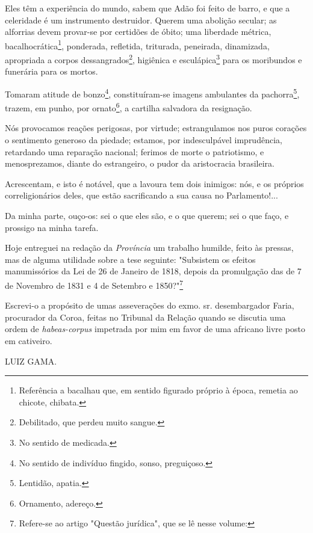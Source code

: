 Eles têm a experiência do mundo, sabem que Adão foi feito de barro, e
que a celeridade é um instrumento destruidor. Querem uma abolição
secular; as alforrias devem provar-se por certidões de óbito; uma
liberdade métrica, bacalhocrática\footnote{Referência a bacalhau que,
  em sentido figurado próprio à época, remetia ao chicote, chibata.},
ponderada, refletida, triturada, peneirada, dinamizada, apropriada a
corpos dessangrados\footnote{Debilitado, que perdeu muito sangue.},
higiênica e esculápica\footnote{No sentido de medicada.} para os
moribundos e funerária para os mortos.

Tomaram atitude de bonzo\footnote{No sentido de indivíduo fingido,
  sonso, preguiçoso.}, constituíram-se imagens ambulantes da
pachorra\footnote{Lentidão, apatia.}, trazem, em punho, por
ornato\footnote{Ornamento, adereço.}, a cartilha salvadora da
resignação.

Nós provocamos reações perigosas, por virtude; estrangulamos nos puros
corações o sentimento generoso da piedade; estamos, por indesculpável
imprudência, retardando uma reparação nacional; ferimos de morte o
patriotismo, e menosprezamos, diante do estrangeiro, o pudor da
aristocracia brasileira.

Acrescentam, e isto é notável, que a lavoura tem dois inimigos: nós, e
os próprios correligionários deles, que estão sacrificando a sua causa
no Parlamento!...

Da minha parte, ouço-os: sei o que eles são, e o que querem; sei o que
faço, e prossigo na minha tarefa.

Hoje entreguei na redação da \emph{Província} um trabalho humilde, feito
às pressas, mas de alguma utilidade sobre a tese seguinte: "Subsistem os
efeitos manumissórios da Lei de 26 de Janeiro de 1818, depois da
promulgação das de 7 de Novembro de 1831 e 4 de Setembro e
1850?"\footnote{Refere-se ao artigo "Questão jurídica", que se lê
  nesse volume:}

Escrevi-o a propósito de
umas asseverações do exmo. sr. desembargador Faria, procurador da Coroa,
feitas no Tribunal da Relação quando se discutia uma ordem de
\emph{habeas-corpus} impetrada por mim em favor de uma africano livre
posto em cativeiro.

LUIZ GAMA.

\pagebreak
\mbox{}\vfill
\thispagestyle{empty}

